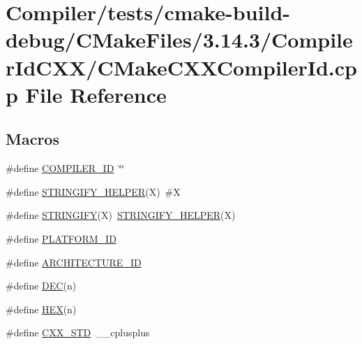 \hypertarget{_compiler_2tests_2cmake-build-debug_2_c_make_files_23_814_83_2_compiler_id_c_x_x_2_c_make_c_x_x_compiler_id_8cpp}{}\section{Compiler/tests/cmake-\/build-\/debug/\+C\+Make\+Files/3.14.3/\+Compiler\+Id\+C\+X\+X/\+C\+Make\+C\+X\+X\+Compiler\+Id.cpp File Reference}
\label{_compiler_2tests_2cmake-build-debug_2_c_make_files_23_814_83_2_compiler_id_c_x_x_2_c_make_c_x_x_compiler_id_8cpp}
\subsection*{Macros}
\begin{DoxyCompactItemize}
\item 
\#define \mbox{\hyperlink{_compiler_2tests_2cmake-build-debug_2_c_make_files_23_814_83_2_compiler_id_c_x_x_2_c_make_c_x_x_compiler_id_8cpp_a81dee0709ded976b2e0319239f72d174}{C\+O\+M\+P\+I\+L\+E\+R\+\_\+\+ID}}~\char`\"{}\char`\"{}
\item 
\#define \mbox{\hyperlink{_compiler_2tests_2cmake-build-debug_2_c_make_files_23_814_83_2_compiler_id_c_x_x_2_c_make_c_x_x_compiler_id_8cpp_a2ae9b72bb13abaabfcf2ee0ba7d3fa1d}{S\+T\+R\+I\+N\+G\+I\+F\+Y\+\_\+\+H\+E\+L\+P\+ER}}(X)~\#X
\item 
\#define \mbox{\hyperlink{_compiler_2tests_2cmake-build-debug_2_c_make_files_23_814_83_2_compiler_id_c_x_x_2_c_make_c_x_x_compiler_id_8cpp_a43e1cad902b6477bec893cb6430bd6c8}{S\+T\+R\+I\+N\+G\+I\+FY}}(X)~\mbox{\hyperlink{_v_m_2cmake-build-debug_2_c_make_files_23_814_83_2_compiler_id_c_x_x_2_c_make_c_x_x_compiler_id_8cpp_a2ae9b72bb13abaabfcf2ee0ba7d3fa1d}{S\+T\+R\+I\+N\+G\+I\+F\+Y\+\_\+\+H\+E\+L\+P\+ER}}(X)
\item 
\#define \mbox{\hyperlink{_compiler_2tests_2cmake-build-debug_2_c_make_files_23_814_83_2_compiler_id_c_x_x_2_c_make_c_x_x_compiler_id_8cpp_adbc5372f40838899018fadbc89bd588b}{P\+L\+A\+T\+F\+O\+R\+M\+\_\+\+ID}}
\item 
\#define \mbox{\hyperlink{_compiler_2tests_2cmake-build-debug_2_c_make_files_23_814_83_2_compiler_id_c_x_x_2_c_make_c_x_x_compiler_id_8cpp_aba35d0d200deaeb06aee95ca297acb28}{A\+R\+C\+H\+I\+T\+E\+C\+T\+U\+R\+E\+\_\+\+ID}}
\item 
\#define \mbox{\hyperlink{_compiler_2tests_2cmake-build-debug_2_c_make_files_23_814_83_2_compiler_id_c_x_x_2_c_make_c_x_x_compiler_id_8cpp_ad1280362da42492bbc11aa78cbf776ad}{D\+EC}}(n)
\item 
\#define \mbox{\hyperlink{_compiler_2tests_2cmake-build-debug_2_c_make_files_23_814_83_2_compiler_id_c_x_x_2_c_make_c_x_x_compiler_id_8cpp_a46d5d95daa1bef867bd0179594310ed5}{H\+EX}}(n)
\item 
\#define \mbox{\hyperlink{_compiler_2tests_2cmake-build-debug_2_c_make_files_23_814_83_2_compiler_id_c_x_x_2_c_make_c_x_x_compiler_id_8cpp_a34cc889e576a1ae6c84ae9e0a851ba21}{C\+X\+X\+\_\+\+S\+TD}}~\+\_\+\+\_\+cplusplus
\end{DoxyCompactItemize}
